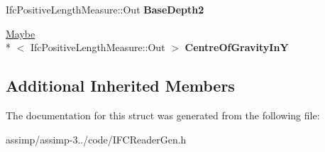 \begin{DoxyCompactItemize}
\item 
\hypertarget{struct_assimp_1_1_i_f_c_1_1_ifc_crane_rail_f_shape_profile_def_a8f03f1e37aab6ff9c54ddb4e7b7925f8}{Ifc\+Positive\+Length\+Measure\+::\+Out {\bfseries Base\+Depth2}}\label{struct_assimp_1_1_i_f_c_1_1_ifc_crane_rail_f_shape_profile_def_a8f03f1e37aab6ff9c54ddb4e7b7925f8}

\item 
\hypertarget{struct_assimp_1_1_i_f_c_1_1_ifc_crane_rail_f_shape_profile_def_afc28e5598f00e29a2293f4b9366723a4}{\hyperlink{struct_assimp_1_1_s_t_e_p_1_1_maybe}{Maybe}\\*
$<$ Ifc\+Positive\+Length\+Measure\+::\+Out $>$ {\bfseries Centre\+Of\+Gravity\+In\+Y}}\label{struct_assimp_1_1_i_f_c_1_1_ifc_crane_rail_f_shape_profile_def_afc28e5598f00e29a2293f4b9366723a4}

\end{DoxyCompactItemize}
\subsection*{Additional Inherited Members}


The documentation for this struct was generated from the following file\+:\begin{DoxyCompactItemize}
\item 
assimp/assimp-\/3../code/I\+F\+C\+Reader\+Gen.\+h\end{DoxyCompactItemize}
